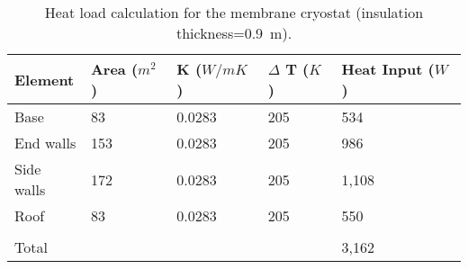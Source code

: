 \begin{table}[htpb]
\centering
\begin{tabular}{|p{}|p{}|p{}|p{}|p{}|}
\hline
 \textbf{Element} & \textbf{Area ($m^2$)}  &  \textbf{K ($W/mK$)} & \textbf{$\Delta$ T ($K$)}
 & \textbf{Heat Input ($W$)}\\ \hline
Base   & 83  & 0.0283   &205   & 534 \\ \hline
End walls  &  153 & 0.0283  &  205 &  986 \\ \hline
Side walls   & 172  & 0.0283  &  205 & 1,108 \\ \hline
Roof  &  83 & 0.0283  & 205  &  550\\ \hline
   &   &   &   &  \\ \hline
Total   &   &   &   & 3,162 \\ \hline
\end{tabular}
\caption{Heat load calculation for the membrane cryostat (insulation thickness=0.9~m). }
\label{tbl:heat-load-calc}
\end{table}


